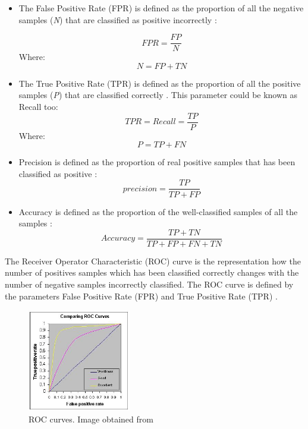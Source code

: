 \begin{itemize}
\item The False Positive Rate (FPR) is defined as the proportion of all the negative samples (\textit{N}) that are classified as positive incorrectly \cite{ROC}:

\begin{equation}
FPR = \frac{FP}{N}
\end{equation}
Where:
 \begin{equation}
  N = FP + TN
\end{equation} 

\item The True Positive Rate (TPR) is defined as the proportion of all the positive samples (\textit{P}) that are classified correctly \cite{ROC}. This parameter could be known as Recall too: 
\begin{equation}
TPR = Recall = \frac{TP}{P} 
\end{equation}
Where:
 \begin{equation}
  P = TP + FN
\end{equation} 

\item Precision is defined as the proportion of real positive samples that has been classified as positive \cite{ROC,Sokolova}:
\begin{equation}
  precision = \frac{TP}{TP + FP}
\end{equation}

\item Accuracy is defined as the proportion of the well-classified samples of all the samples \cite{Sokolova}:
\begin{equation}
  Accuracy = \frac{TP + TN}{TP + FP + FN + TN}
\end{equation}
\end{itemize}

The Receiver Operator Characteristic (ROC) curve is the representation how the number of positives samples which has been classified correctly changes with the number of negative samples incorrectly classified. The ROC curve is defined by the parameters False Positive Rate (FPR) and True Positive Rate (TPR) \cite{ROC}.\\

\begin{figure}[htb]
  \centering
  \includegraphics[width=0.4\textwidth]{images_miscelaneus/roccomp.jpg}
  \caption{ROC curves. Image obtained from \cite{RocImage}}
  \label{RocImage}
\end{figure}

